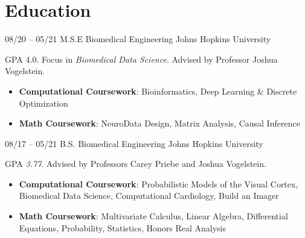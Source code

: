 \section{Education}

\cventry
{08/20 -- 05/21}
{M.S.E Biomedical Engineering}
{Johns Hopkins University}
{%
}
{}
{
GPA 4.0.
Focus in \textit{Biomedical Data Science}.
Advised by Professor Joshua Vogelstein.
\begin{itemize}
    \item {\textbf{Computational Coursework}: Bioinformatics, Deep Learning \& Discrete Optimization}
    \item {\textbf{Math Coursework}: NeuroData Design, Matrix Analysis, Causal Inference}
\end{itemize}
}

\cventry
{08/17 -- 05/21}
{B.S. Biomedical Engineering}
{Johns Hopkins University}
{%
}
{}
{
GPA \textit{3.77}.
Advised by Professors Carey Priebe and Joshua Vogelstein.
\begin{itemize}
    \item {\textbf{Computational Coursework}: Probabilistic Models of the Visual Cortex, Biomedical Data Science, Computational Cardiology, Build an Imager}
    \item {\textbf{Math Coursework}: Multivariate Calculus, Linear Algebra, Differential Equations, Probability, Statistics, Honors Real Analysis}
\end{itemize}
}
